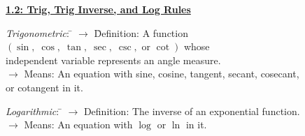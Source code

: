 \textbf{\underline{\large{1.2: Trig, Trig Inverse, and Log Rules}}} \par

\begin{tcolorbox}[definition]
    \begin{tabbing}
        \textit{Trigonometric}: \= $\rightarrow$ \= Definition: A function $(\sin, \; \cos, \; \tan, \; \sec, \; \csc, \text{ or } \cot)$ whose \\ 
        \> \> independent variable represents an angle measure. \\[5.5pt]
        \> $\rightarrow$ Means: An equation with sine, cosine, tangent, secant, cosecant, \\ 
        \> \> or cotangent in it.
    \end{tabbing}
    \begin{tabbing}
        \textit{Logarithmic}: \= $\rightarrow$ Definition: The inverse of an exponential function. \\[5.5pt]
        \> $\rightarrow$ Means: An equation with $\log$ or $\ln$ in it.
    \end{tabbing}
\end{tcolorbox}

\begin{center}
\end{center}
\begin{center}
\end{center}

